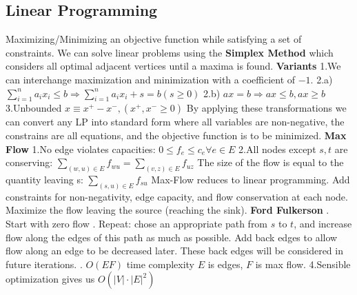 \documentclass{article}
\begin{document}
\begin{multicols}{2}
\section*{Linear Programming}
Maximizing/Minimizing an objective function while satisfying a set of constraints. We can solve linear problems using the \textbf{Simplex Method} which considers all optimal adjacent vertices until a maxima is found. \newline
\textbf{Variants} \newline
1.We can interchange maximization and minimization with a coefficient of $-1$.\newline  
2.a) $\sum_{i=1}^n a_i x_i \leq b \Longrightarrow \sum_{i=1}^n a_i x_i + s = b (s \geq 0)$ \newline 
2.b) $ax = b \Longrightarrow ax \leq b, ax \geq b$ \newline 
3.Unbounded $x \equiv x^+ - x^-, (x^+, x^- \geq 0)$ \newline 
By applying these transformations we can convert any LP into standard form where all variables are non-negative, the constrains are all equations, and the objective function is to be minimized. \newline 
\textbf{Max Flow} \newline 
1.No edge violates capacities: $0 \leq f_e \leq c_e \forall e \in E$ \newline 
2.All nodes except $s, t$ are conserving: \newline $\sum_{(w, u)\in E} f_{wu} = \sum_{(v, z) \in E} f_{uz}$ \newline 
The size of the flow is equal to the quantity leaving s:  $\sum_{(s, u)\in E}f_{su}$ \newline 
Max-Flow reduces to linear programming. Add constraints for non-negativity, edge capacity, and flow conservation at each node. Maximize the flow leaving the source (reaching the sink). \newline 
\textbf{Ford Fulkerson} . Start with zero flow . Repeat: chose an appropriate path from $s$ to $t$, and increase flow along the edges of this path as much as possible. Add back edges to allow flow along an edge to be decreased later. These back edges will be considered in future iterations. . $O(EF)$ time complexity $E$ is edges, $F$ is max flow.
4.Sensible optimization gives us $O(|V| \cdot |E|^2)$ \newline 

\end{multicols}
\end{document}

